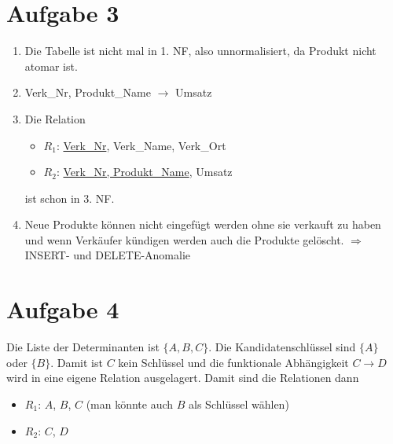 \documentclass{article}
\begin{document}
	\section*{Aufgabe 3}
	\begin{enumerate}[label=(\alph*)]
		\item Die Tabelle ist nicht mal in 1. NF, also unnormalisiert, da Produkt nicht atomar ist.
		\item Verk\_Nr, Produkt\_Name $\to$ Umsatz
		\item Die Relation
		\begin{itemize}
			\item $R_1$: \underline{Verk\_Nr}, Verk\_Name, Verk\_Ort
			\item $R_2$: \underline{Verk\_Nr, Produkt\_Name}, Umsatz
		\end{itemize}
		ist schon in 3. NF.
		\item Neue Produkte können nicht eingefügt werden ohne sie verkauft zu haben und wenn Verkäufer kündigen werden auch die Produkte gelöscht. $\Rightarrow$ INSERT- und DELETE-Anomalie
	\end{enumerate}
	
	\section*{Aufgabe 4}
	Die Liste der Determinanten ist $\{A, B, C\}$. Die Kandidatenschlüssel sind $\{A\}$ oder $\{B\}$. Damit ist $C$ kein Schlüssel und die funktionale Abhängigkeit $C\to D$ wird in eine eigene Relation ausgelagert. Damit sind die Relationen dann
	\begin{itemize}
		\item $R_1$: \underline{$A$}, $B$, $C$ (man könnte auch $B$ als Schlüssel wählen)
		\item $R_2$: \underline{$C$}, $D$
	\end{itemize}
	
\end{document}
